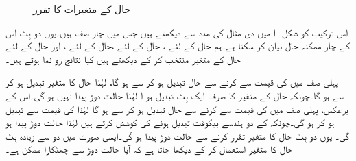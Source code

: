 \begin{figure}
\begin{subfigure}{0.45\textwidth}
\caption{}
\end{subfigure}
\caption{حال کے متغیرات کا تقرر}
\label{شکل_غیر_معاصر_حال_کے_متغیر_کا_تقرر}
\end{figure}


اس ترکیب کو شکل  -ا میں دی مثال کی مدد سے دیکھتے ہیں جس میں چار صف ہیں۔یوں دو بِٹ  اس کے چار ممکنہ حال بیان کر سکتا ہے۔ہم حال  کے لئے ، حال  کے لئے ،حال  کے لئے ، اور حال  کے لئے  حال کے متغیر منتخب کر کے دیکھتے ہیں کیا نتائج رو نما ہوتے ہیں۔

 پہلی صف میں  کی قیمت  سے  کرنے سے حال تبدیل ہو کر سے  ہو گا، لہٰذا حال کا متغیر  تبدیل ہو کر  سے  ہو گا۔چونکہ حال کے متغیر کا صرف ایک بِٹ تبدیل ہو ا لہٰذا حالت دوڑ پیدا نہیں ہو گی۔اس کے برعکس، پہلی صف میں  کی قیمت  سے  کرنے سے حال تبدیل ہو کر  سے  ہو گا لہٰذا  کی قیمت  سے تبدیل ہو کر  ہو گی۔چونکہ  کے دو ہندسے بیکوقت تبدیل ہونے کی کوشش کرتے ہیں لہٰذا حالت دوڑ پیدا ہو گی۔ یوں دو بِٹ حال کا متغیر تقرر کرنے سے حالت دوڑ پیدا ہو گی۔ایسی صورت میں دو سے زیادہ بِٹ حال کا متغیر استعمال کر کے دیکھا جاتا ہے کہ آیا حالت دوڑ سے چھٹکارا ممکن ہے۔

